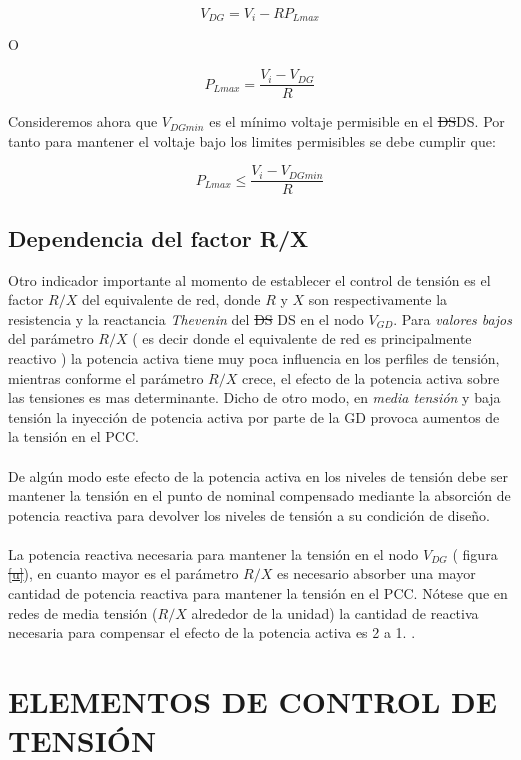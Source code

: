 \documentclass[12pt, letterpaper]{report}
\providecommand{\DIFaddtex}[1]{{\protect\color{blue}\uwave{#1}}} %
\providecommand{\DIFdeltex}[1]{{\protect\color{red}\sout{#1}}}                      %
\providecommand{\DIFaddbegin}{} %
\providecommand{\DIFaddend}{} %
\providecommand{\DIFdelbegin}{} %
\providecommand{\DIFdelend}{} %
\providecommand{\DIFadd}[1]{\texorpdfstring{\DIFaddtex{#1}}{#1}} %
\providecommand{\DIFdel}[1]{\texorpdfstring{\DIFdeltex{#1}}{}} %
\begin{document}
\[V_{DG} = V_{i} - RP_{Lmax}\]

O

\[P_{Lmax} = \dfrac{V_{i} - V_{DG }}{R}\]

Consideremos ahora que $V_{DGmin}$ es el mínimo voltaje permisible en el \DIFdelbegin \DIFdel{DS}\DIFdelend \DIFaddbegin \ac{DS}\DIFaddend . Por tanto para mantener el voltaje bajo los limites permisibles  se debe cumplir que:

\[P_{Lmax} \leq \dfrac{V_{i} - V_{DGmin}}{R}\]

\subsection{Dependencia del factor R/X}
Otro indicador importante al momento de establecer el control de tensión es el factor $ R/X$ del equivalente de red, donde $R$  y $X$ son respectivamente la resistencia y la reactancia  \textit{Thevenin} del \DIFdelbegin \DIFdel{DS }\DIFdelend \DIFaddbegin \ac{DS} \DIFaddend en el nodo $V_{GD}$.    Para \textit{valores bajos} del parámetro $R/X$ ( es decir donde el equivalente de red es principalmente reactivo ) la potencia activa tiene muy poca  influencia en los perfiles de tensión, mientras conforme el parámetro $R/X$ crece, el efecto de la potencia activa sobre las tensiones es mas determinante. Dicho de otro modo, en \textit{media tensión } y baja tensión la inyección de potencia activa por parte de la GD provoca aumentos de la tensión en el PCC.\\\\
De algún modo este efecto de la potencia activa en los niveles de tensión debe ser mantener la tensión en el punto de nominal compensado mediante la absorción de potencia reactiva para devolver los niveles de tensión a su condición de diseño.\\\\
La potencia reactiva necesaria para mantener la tensión en el nodo $ V_{DG}$ ( figura \DIFdelbegin \DIFdel{\ref{u}}\DIFdelend \DIFaddbegin \DIFadd{\ref{fig:dos_nodos}}\DIFaddend ), en cuanto mayor es el parámetro $R/X$ es necesario absorber una mayor cantidad de potencia reactiva  para mantener la tensión en el PCC. Nótese que en redes de media tensión ($R/X$ alrededor de la unidad) la cantidad de  reactiva necesaria para compensar el efecto de la potencia activa es 2 a 1. \cite{trebolle2012control}.

\section{ELEMENTOS DE CONTROL DE TENSIÓN}
\end{document}
